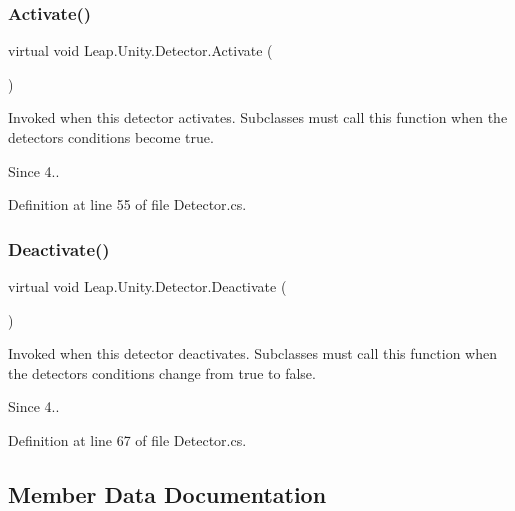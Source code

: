\subsubsection{\texorpdfstring{Activate()}{Activate()}}
{\footnotesize\ttfamily virtual void Leap.\+Unity.\+Detector.\+Activate (\begin{DoxyParamCaption}{ }\end{DoxyParamCaption})\hspace{0.3cm}{\ttfamily [virtual]}}

Invoked when this detector activates. Subclasses must call this function when the detector\textquotesingle{}s conditions become true. \begin{DoxySince}{Since}
4.. 
\end{DoxySince}


Definition at line 55 of file Detector.\+cs.

\mbox{\label{class_leap_1_1_unity_1_1_detector_a6493874fd22793d7b59dc56098559d59}} 
\subsubsection{\texorpdfstring{Deactivate()}{Deactivate()}}
{\footnotesize\ttfamily virtual void Leap.\+Unity.\+Detector.\+Deactivate (\begin{DoxyParamCaption}{ }\end{DoxyParamCaption})\hspace{0.3cm}{\ttfamily [virtual]}}

Invoked when this detector deactivates. Subclasses must call this function when the detector\textquotesingle{}s conditions change from true to false. \begin{DoxySince}{Since}
4.. 
\end{DoxySince}


Definition at line 67 of file Detector.\+cs.



\subsection{Member Data Documentation}
\mbox{\label{class_leap_1_1_unity_1_1_detector_aae0718ccceffd88a12d63ad718cda346}} 
